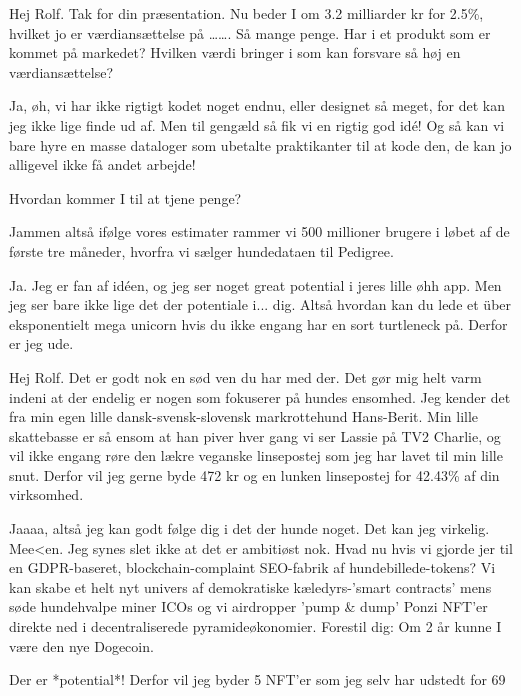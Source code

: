 \documentclass[a4paper,11pt]{article}
\begin{document}
\begin{sketch}
 Hej Rolf. Tak for din præsentation. Nu beder I om 3.2 milliarder kr for 2.5\%, hvilket jo er værdiansættelse på   …….  Så mange penge. Har i et produkt som er kommet på markedet? Hvilken værdi bringer i som kan forsvare så høj en værdiansættelse?

 Ja, øh, vi har ikke rigtigt kodet noget endnu, eller designet så meget, for det kan jeg ikke lige finde ud af. Men til gengæld så fik vi en rigtig god idé! Og så kan vi bare hyre en masse dataloger som ubetalte praktikanter til at kode den, de kan jo alligevel ikke få andet arbejde!

 Hvordan kommer I til at tjene penge?

 Jammen altså ifølge vores estimater rammer vi 500 millioner brugere i løbet af de første tre måneder, hvorfra vi sælger hundedataen til Pedigree.


 Ja. Jeg er fan af idéen, og jeg ser noget great potential i jeres lille øhh app. Men jeg ser bare ikke lige det der potentiale i... dig. Altså hvordan kan du lede et über eksponentielt mega unicorn hvis du ikke engang har en sort turtleneck på. Derfor er jeg ude.

 Hej Rolf. Det er godt nok en sød ven du har med der. Det gør mig helt varm indeni at der endelig er nogen som fokuserer på hundes ensomhed. 
Jeg kender det fra min egen lille dansk-svensk-slovensk markrottehund Hans-Berit. Min lille skattebasse er så ensom at han piver hver gang vi ser Lassie på TV2 Charlie, og vil ikke engang røre den lækre veganske linsepostej som jeg har lavet til min lille snut.
Derfor vil jeg gerne byde 472 kr og en lunken linsepostej for 42.43\% af din virksomhed.


Jaaaa, altså jeg kan godt følge dig i det der hunde noget. Det kan jeg virkelig. 
Mee<en.
Jeg synes slet ikke at det er ambitiøst nok. Hvad nu hvis vi gjorde jer til en GDPR-baseret, blockchain-complaint SEO-fabrik af hundebillede-tokens?  
Vi kan skabe et helt nyt univers af demokratiske kæledyrs-'smart contracts' mens søde hundehvalpe miner ICOs og vi airdropper 'pump & dump' Ponzi NFT'er direkte ned i decentraliserede pyramideøkonomier.
Forestil dig: Om 2 år kunne I være den nye Dogecoin.

Der er *potential*!
Derfor vil jeg byder 5 NFT'er som jeg selv har udstedt for 69%


\end{sketch}
\end{document}
